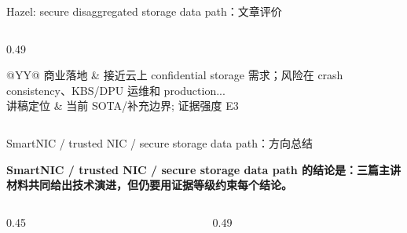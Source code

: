 \begin{frame}[t,shrink=6]{Hazel: secure disaggregated storage data path：文章评价}
\begin{columns}[T,totalwidth=\textwidth]
\begin{column}{0.49\textwidth}
{\begin{minipage}[t]{0.97\linewidth}
\begin{minipage}{0.92\linewidth}
{\begin{tabularx}{\linewidth}{@{}YY@{}}
商业落地 & 接近云上 confidential storage 需求；风险在 crash consistency、KBS/DPU 运维和 production... \\
讲稿定位 & 当前 SOTA/补充边界; 证据强度 E3 \\
\bottomrule
\end{tabularx}
}
    \end{minipage}
    \vspace{1mm}
  \end{minipage}}
  \end{column}
\end{columns}
\end{frame}


\begin{frame}[t,shrink=6]{SmartNIC / trusted NIC / secure storage data path：方向总结}
{\large\bfseries\color{Ink} SmartNIC / trusted NIC / secure storage data path 的结论是：三篇主讲材料共同给出技术演进，但仍要用证据等级约束每个结论。\par}\vspace{1.2mm}
\begin{columns}[T,totalwidth=\textwidth]
  \begin{column}{0.45\textwidth}
  \end{column}
  \begin{column}{0.49\textwidth}

\end{column}
\end{columns}
\end{frame}
